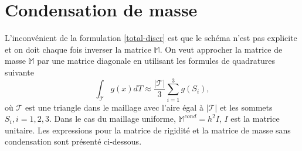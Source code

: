 \documentclass[12pt]{article}
\begin{document}
\section{Condensation de masse}
L'inconvénient de la formulation \eqref{total-discr} est que le schéma n'est pas explicite et on doit chaque fois inverser la matrice $\mathbb{M}$. On veut approcher la matrice de masse $\mathbb{M}$ par une matrice diagonale en utilisant les formules de quadratures suivante
\begin{equation}
	\int_{\mathcal{T}}{g(x) dT} \approx \frac{|\mathcal{T}|}{3}\sum_{i = 1}^3{g(S_i)},
\end{equation}
où $\mathcal{T}$ est une triangle dans le maillage avec l'aire égal à $|\mathcal{T}|$ et les sommets $S_i, i = 1,2,3$.
Dans le cas du maillage uniforme, $\mathbb{M}^{cond} = h^2I$, $I$ est la matrice unitaire.
Les expressions pour la matrice de rigidité et la matrice de masse sans condensation sont présenté ci-dessous.
\end{document}
